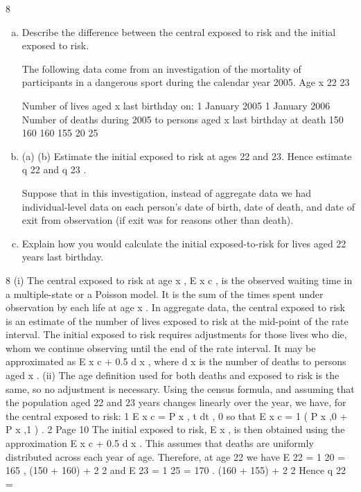 \documentclass[a4paper,12pt]{article}
\begin{document}
8
\begin{enumerate}[(a)]
\item Describe the difference between the central exposed to risk and the initial
exposed to risk.

The following data come from an investigation of the mortality of participants in a
dangerous sport during the calendar year 2005.
Age x
22
23


Number of lives aged x last
birthday on:
1 January 2005 1 January 2006 Number of deaths
during 2005 to
persons aged x last
birthday at death
150
160 160
155 20
25
\item 
(a)
(b)
Estimate the initial exposed to risk at ages 22 and 23.
Hence estimate q 22 and q 23 .

Suppose that in this investigation, instead of aggregate data we had individual-level data on each person’s date of birth, date of death, and date of exit from observation (if
exit was for reasons other than death).
\item 
Explain how you would calculate the initial exposed-to-risk for lives aged 22
years last birthday.

\end{enumerate}
8
(i)
The central exposed to risk at age x , E x c , is the observed waiting time in a multiple-state or a Poisson model. It is the sum of the times spent under
observation by each life at age x .
In aggregate data, the central exposed to risk is an estimate of the number of lives exposed to risk at the mid-point of the rate interval.
The initial exposed to risk requires adjustments for those lives who die, whom we continue observing until the end of the rate interval.
It may be approximated as E x c + 0.5 d x , where d x is the number of deaths to persons aged x .
(ii)
The age definition used for both deaths and exposed to risk is the same, so no adjustment is necessary.
Using the census formula, and assuming that the population aged 22 and 23 years changes linearly over the year, we have, for the central exposed to risk:
1
E x c = \int P x , t dt ,
0
so that
E x c =
1
( P x ,0 + P x ,1 ) .
2
Page 10%
The initial exposed to risk, E x , is then obtained using the approximation
E x c + 0.5 d x .
This assumes that deaths are uniformly distributed across each year of age.
Therefore, at age 22 we have
E 22 =
1
20
= 165 ,
(150 + 160) +
2
2
and
E 23 =
1
25
= 170 .
(160 + 155) +
2
2
Hence q 22 =
\end{document}
